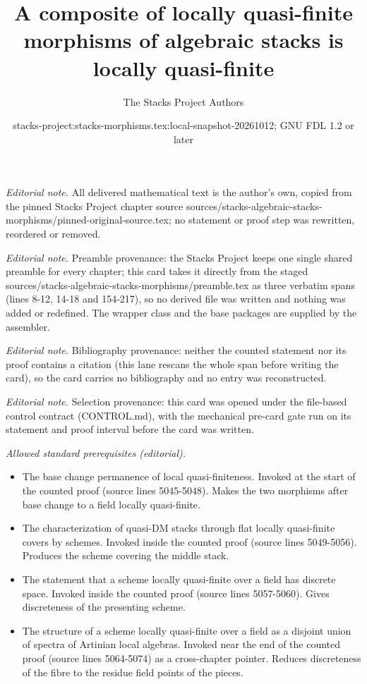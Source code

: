 \documentclass[10pt,a4paper]{amsart}
\title{A composite of locally quasi-finite morphisms of algebraic stacks is locally quasi-finite}
\author{The Stacks Project Authors}
\date{stacks-project:stacks-morphisms.tex:local-snapshot-20261012; GNU FDL 1.2 or later}
\theoremstyle{plain}
\theoremstyle{definition}
\theoremstyle{remark}
\numberwithin{equation}{subsection}
\begin{document}
\maketitle
\noindent\textit{Editorial note.} All delivered mathematical text is the author's own, copied from the pinned Stacks Project chapter source sources/stacks-algebraic-stacks-morphisms/pinned-original-source.tex; no statement or proof step was rewritten, reordered or removed.\par\medskip
\noindent\textit{Editorial note.} Preamble provenance: the Stacks Project keeps one single shared preamble for every chapter; this card takes it directly from the staged sources/stacks-algebraic-stacks-morphisms/preamble.tex as three verbatim spans (lines 8-12, 14-18 and 154-217), so no derived file was written and nothing was added or redefined. The wrapper class and the base packages are supplied by the assembler.\par\medskip
\noindent\textit{Editorial note.} Bibliography provenance: neither the counted statement nor its proof contains a citation (this lane rescans the whole span before writing the card), so the card carries no bibliography and no entry was reconstructed.\par\medskip
\noindent\textit{Editorial note.} Selection provenance: this card was opened under the file-based control contract (CONTROL.md), with the mechanical pre-card gate run on its statement and proof interval before the card was written.\par\medskip
\noindent\textit{Allowed standard prerequisites (editorial).}\begin{itemize}
\item The base change permanence of local quasi-finiteness. Invoked at the start of the counted proof (source lines 5045-5048). Makes the two morphisms after base change to a field locally quasi-finite.
\item The characterization of quasi-DM stacks through flat locally quasi-finite covers by schemes. Invoked inside the counted proof (source lines 5049-5056). Produces the scheme covering the middle stack.
\item The statement that a scheme locally quasi-finite over a field has discrete space. Invoked inside the counted proof (source lines 5057-5060). Gives discreteness of the presenting scheme.
\item The structure of a scheme locally quasi-finite over a field as a disjoint union of spectra of Artinian local algebras. Invoked near the end of the counted proof (source lines 5064-5074) as a cross-chapter pointer. Reduces discreteness of the fibre to the residue field points of the pieces.
\end{itemize}\medskip
\end{document}

